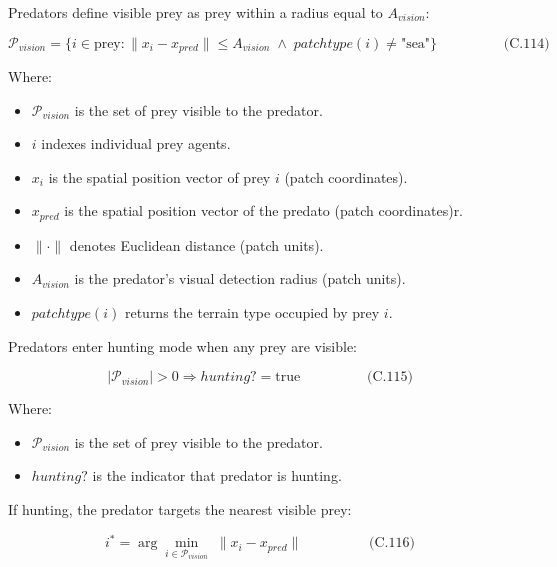 \documentclass[
]{book}
\providecommand{\tightlist}{%
  \setlength{\itemsep}{0pt}\setlength{\parskip}{0pt}}
\begin{document}
Predators define visible prey as prey within a radius equal to
\(A_{vision}\):

\[
\begin{equation} \mathcal{P}_{vision} = \{i \in \text{prey} : \|x_i - x_{pred}\| \le A_{vision} \;\land\; patchtype(i) \ne \text{"sea"}\}  \hspace{2cm} \text{(C.114)} \end{equation}
\]

Where:

\begin{itemize}
\tightlist
\item
  \(\mathcal{P}_{vision}\) is the set of prey visible to the predator.
\item
  \(i\) indexes individual prey agents.
\item
  \(x_i\) is the spatial position vector of prey \(i\) (patch
  coordinates).
\item
  \(x_{pred}\) is the spatial position vector of the predato (patch
  coordinates)r.
\item
  \(\|\cdot\|\) denotes Euclidean distance (patch units).
\item
  \(A_{vision}\) is the predator's visual detection radius (patch
  units).
\item
  \(patchtype(i)\) returns the terrain type occupied by prey \(i\).
\end{itemize}

Predators enter hunting mode when any prey are visible:

\[
\begin{equation} |\mathcal{P}_{vision}| > 0 \Rightarrow hunting? = \text{true}  \hspace{2cm} \text{(C.115)} \end{equation}
\]

Where:

\begin{itemize}
\tightlist
\item
  \(\mathcal{P}_{vision}\) is the set of prey visible to the predator.
\item
  \(hunting?\) is the indicator that predator is hunting.
\end{itemize}

If hunting, the predator targets the nearest visible prey:

\[
\begin{equation} i^* = \arg\min_{i \in \mathcal{P}_{vision}} \; \|x_i - x_{pred}\|  \hspace{2cm} \text{(C.116)} \end{equation}
\]
\end{document}
